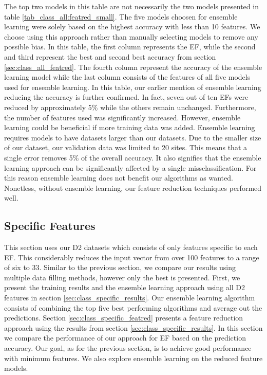 \documentclass[12pt,letterpaper]{article}
\begin{document}
The top two models in this table are not necessarily the two models presented in table \ref{tab_class_all:featred_small}.
The five models choosen for ensemble learning were solely based on the highest accuracy with less than 10 features.
We choose using this approach rather than manually selecting models to remove any possible bias.
In this table, the first column represents the \ac{EF}, while the second and third represent the best and second best accuracy from section \ref{sec:class_all_featred}.
The fourth column represent the accuracy of the ensemble learning model while the last column consists of the features of all five models used for ensemble learning.
In this table, our earlier mention of ensemble learning reducing the accuracy is further confirmed.
In fact, seven out of ten \ac{EF}s were reduced by approximately 5\% while the others remain unchanged.
Furthermore, the number of features used was significantly increased.
However, ensemble learning could be beneficial if more training data was added.
Ensemble learning requires models to have datasets larger than our datasets.
Due to the smaller size of our dataset, our validation data was limited to 20 sites.
This means that a single error removes 5\% of the overall accuracy.
It also signifies that the ensemble learning approach can be significantly affected by a single missclassification.
For this reason ensemble learning does not benefit our algorithms as wanted.
Nonetless, without ensemble learning, our feature reduction techniques performed well.

\clearpage
\subsection{Specific Features}\label{sec:class_spec}
This section uses our D2 datasets which consists of only features specific to each \ac{EF}.
This considerably reduces the input vector from over 100 features to a range of six to 33.
Similar to the previous section, we compare our results using multiple data filling methods, however only the best is presented.
First, we present the training results and the ensemble learning approach using all D2 features in section \ref{sec:class_specific_results}.
Our ensemble learning algorithm consists of combining the top five best performing algorithms and average out the predictions.
Section \ref{sec:class_specific_featred} presents a feature reduction approach using the results from section \ref{sec:class_specific_results}.
In this section we compare the performance of our approach for \ac{EF} based on the prediction accuracy.
Our goal, as for the previous section, is to achieve good performance with minimum features.
We also explore ensemble learning on the reduced feature models.
\end{document}

